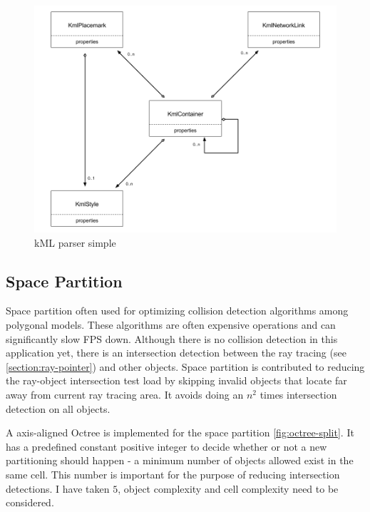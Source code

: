 \begin{figure}[H]
\caption{kML parser simple}
\label{fig:kml-parser-simple}
\centering
\includegraphics[width=\linewidth]{Figures/kml-parser-simple.png}
\decoRule
\end{figure}

\subsection{Space Partition} 
\label{section:space-partition}

Space partition often used for optimizing collision detection algorithms among polygonal models. These algorithms are often expensive operations and can significantly slow FPS down. Although there is no collision detection in this application yet, there is an intersection detection between the ray tracing (see \ref{section:ray-pointer}) and other objects. Space partition is contributed to reducing the ray-object intersection test load by skipping invalid objects that locate far away from current ray tracing area. It avoids doing an $n^2$ times intersection detection on all objects.

A axis-aligned Octree is implemented for the space partition \ref{fig:octree-split}. It has a predefined constant positive integer to decide whether or not a new partitioning should happen - a minimum number of objects allowed exist in the same cell. This number is important for the purpose of reducing intersection detections. I have taken $5$, object complexity and cell complexity need to be considered.

